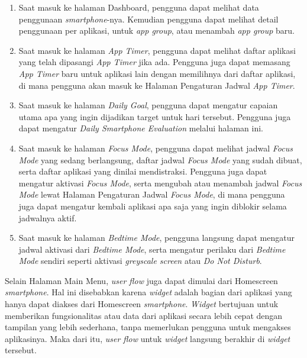 \begin{enumerate}
  \item Saat masuk ke halaman Dashboard, pengguna dapat melihat data penggunaan \textit{smartphone}-nya. Kemudian pengguna dapat melihat detail penggunaan per aplikasi, untuk \textit{app group}, atau menambah \textit{app group} baru.
  \item Saat masuk ke halaman \textit{App Timer}, pengguna dapat melihat daftar aplikasi yang telah dipasangi \textit{App Timer} jika ada. Pengguna juga dapat memasang \textit{App Timer} baru untuk aplikasi lain dengan memilihnya dari daftar aplikasi, di mana pengguna akan masuk ke Halaman Pengaturan Jadwal \textit{App Timer}.
  \item Saat masuk ke halaman \textit{Daily Goal}, pengguna dapat mengatur capaian utama apa yang ingin dijadikan target untuk hari tersebut. Pengguna juga dapat mengatur \textit{Daily Smartphone Evaluation} melalui halaman ini.
  \item Saat masuk ke halaman \textit{Focus Mode}, pengguna dapat melihat jadwal \textit{Focus Mode} yang sedang berlangsung, daftar jadwal \textit{Focus Mode} yang sudah dibuat, serta daftar aplikasi yang dinilai mendistraksi. Pengguna juga dapat mengatur aktivasi \textit{Focus Mode}, serta mengubah atau menambah jadwal \textit{Focus Mode} lewat Halaman Pengaturan Jadwal \textit{Focus Mode}, di mana pengguna juga dapat mengatur kembali aplikasi apa saja yang ingin diblokir selama jadwalnya aktif.
  \item Saat masuk ke halaman \textit{Bedtime Mode}, pengguna langsung dapat mengatur jadwal aktivasi dari \textit{Bedtime Mode}, serta mengatur perilaku dari \textit{Bedtime Mode} sendiri seperti aktivasi \textit{greyscale screen} atau \textit{Do Not Disturb}.
\end{enumerate}

Selain Halaman Main Menu, \textit{user flow} juga dapat dimulai dari Homescreen \textit{smartphone}. Hal ini disebabkan karena \textit{widget} adalah bagian dari aplikasi yang hanya dapat diakses dari Homescreen \textit{smartphone}. \textit{Widget} bertujuan untuk memberikan fungsionalitas atau data dari aplikasi secara lebih cepat dengan tampilan yang lebih sederhana, tanpa memerlukan pengguna untuk mengakses aplikasinya. Maka dari itu, \textit{user flow} untuk \textit{widget} langsung berakhir di \textit{widget} tersebut.
